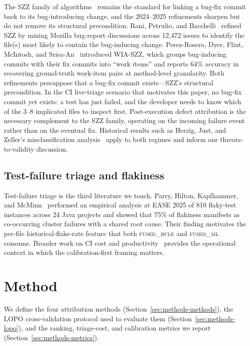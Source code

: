 \documentclass[preprint,12pt]{elsarticle}
\begin{document}
The SZZ family of algorithms~\cite{sliwerski2005,bird2009,herzig2013,rosa2021} remains the standard for linking a bug-fix commit back to its bug-introducing change, and the 2024--2025 refinements sharpen but do not remove its structural precondition. Rani, Petrulio, and Bacchelli~\cite{rani2024szzdiscussion} refined SZZ by mining Mozilla bug-report discussions across 12{,}472 issues to identify the file(s) most likely to contain the bug-inducing change. Perez-Rosero, Dyer, Flint, McIntosh, and Srisa-An~\cite{perezrosero2025wiaszz} introduced WIA-SZZ, which groups bug-inducing commits with their fix commits into ``work items'' and reports 64\% accuracy in recovering ground-truth work-item pairs at method-level granularity. Both refinements presuppose that a bug-fix commit exists---SZZ's structural precondition. In the CI live-triage scenario that motivates this paper, no bug-fix commit yet exists: a test has just failed, and the developer needs to know which of the 3--8 implicated files to inspect first. Post-execution defect attribution is the necessary complement to the SZZ family, operating on the incoming failure event rather than on the eventual fix. Historical results such as Herzig, Just, and Zeller's misclassification analysis~\cite{herzig2013} apply to both regimes and inform our threats-to-validity discussion.

\subsection{Test-failure triage and flakiness}

Test-failure triage is the third literature we touch. Parry, Hilton, Kapfhammer, and McMinn~\cite{parry2025systemic} performed an empirical analysis at EASE 2025 of 810 flaky-test instances across 24 Java projects and showed that 75\% of flakiness manifests as co-occurring cluster failures with a shared root cause. Their finding motivates the per-file historical-flake-rate feature that both \textsc{fused\_rule} and \textsc{fused\_ml} consume. Broader work on CI cost and productivity~\cite{vasilescu2018} provides the operational context in which the calibration-first framing matters.

\section{Method}
\label{sec:methods}

We define the four attribution methods (Section~\ref{sec:methods-methods}), the LOPO cross-validation protocol used to evaluate them (Section~\ref{sec:methods-lopo}), and the ranking, triage-cost, and calibration metrics we report (Section~\ref{sec:methods-metrics}).
\end{document}

